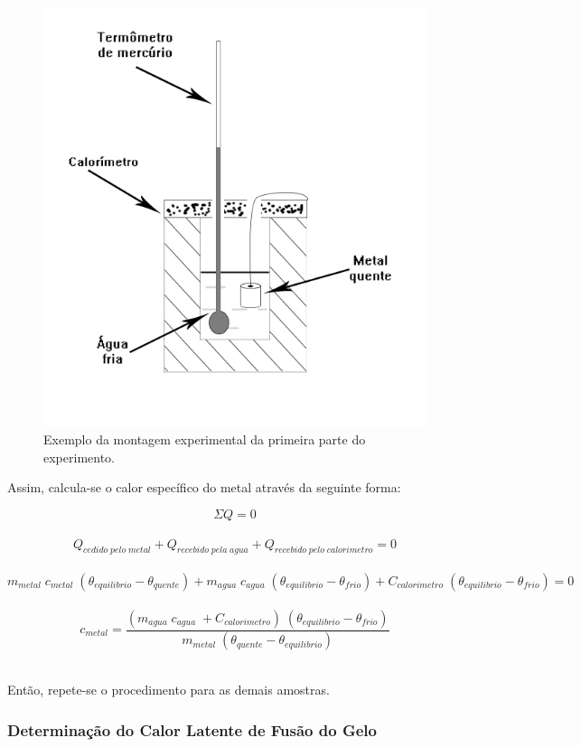 \documentclass[12pt,a4paper]{article}
\begin{document}
\begin{figure}[!htbp]
\centering
\includegraphics[scale=0.45]{Fig6b1.jpg}
\caption{Exemplo da montagem experimental da primeira parte do experimento.}
\label{CalorMetais}
\end{figure}

Assim, calcula-se o calor específico do metal através da seguinte forma:

$$\Sigma Q = 0$$\
$$Q_{cedido\; pelo\; metal} + Q_{recebido\; pela\; agua} + Q_{recebido\; pelo\; calorimetro} = 0$$\
$$m_{metal} \; c_{metal} \; (\theta_{equilibrio} - \theta_{quente}) + m_{agua} \; c_{agua} \;  (\theta_{equilibrio} - \theta_{frio}) + C_{calorimetro} \; (\theta_{equilibrio} - \theta_{frio}) = 0$$\
$$c_{metal} = \frac{(m_{agua} \; c_{agua} \; + C_{calorimetro}) \; (\theta_{equilibrio} - \theta_{frio})}{m_{metal} \;(\theta_{quente} - \theta_{equilibrio})}$$\

Então, repete-se o procedimento para as demais amostras.

\subsubsection{Determinação do Calor Latente de Fusão do Gelo}
\end{document}
